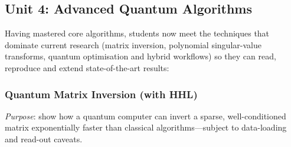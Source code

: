 \subsection{Unit 4: Advanced Quantum Algorithms}

Having mastered core algorithms, students now meet the techniques that dominate current research
(matrix inversion, polynomial singular-value transforms, quantum optimisation and hybrid workflows)
so they can read, reproduce and extend state-of-the-art results:

\subsubsection{Quantum Matrix Inversion (with HHL)}

\emph{Purpose}: show how a quantum computer can invert a sparse, well-conditioned matrix
 exponentially faster than classical algorithms—subject to data-loading and read-out caveats.
 



